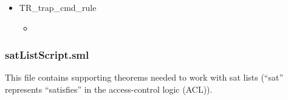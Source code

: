 \begin{itemize}
\begin{itemize}
            \\\tab\tab\tab\tab(   ( )\HOLSymConst{::})  ) \HOLSymConst{\HOLTokenConj{}}
       \\\tab\tab(\HOLSymConst{,}\HOLSymConst{,})   ( )
     \end{itemize}
     \item TR_trap_cmd_rule
  \begin{itemize}
    \item []
      \end{itemize}
    \end{itemize}

\subsubsection{satListScript.sml}
\label{sec:satlistscript.sml}

This file contains supporting theorems needed to work with sat lists (“sat” represents
“satisfies” in the access-control logic (ACL)).

